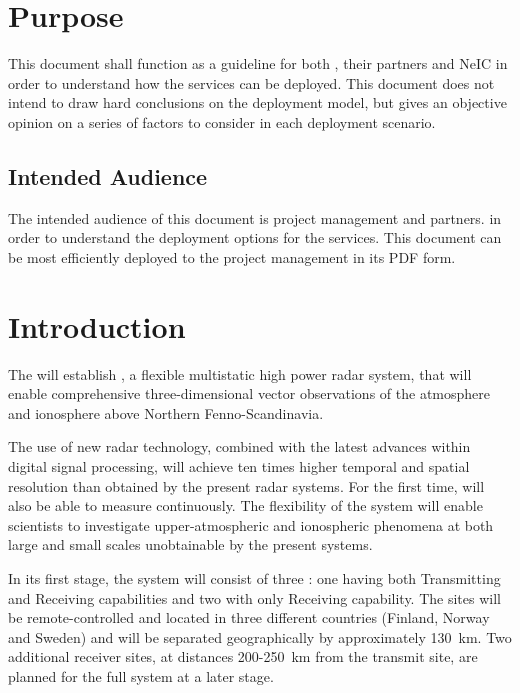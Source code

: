 \documentclass[12pt,a4paper]{article}
\begin{document}
\section{Purpose}
\label{purpose}

This document shall function as a guideline for both \EC, their partners and NeIC in order to understand how the \ED \einfra services can be deployed.
This document does not intend to draw hard conclusions on the deployment model, but gives an objective opinion on a series of factors to consider in each deployment scenario.

\subsection{Intended Audience}
\label{ssec:audiance}

The intended audience of this document is \ED project management and \EC partners.
in order to understand the deployment options for the \ED \einfra services.
This document can be
most efficiently deployed to the \ED project management in its PDF form.

\section{Introduction}
\label{intro}

The \ESA will establish \ED, a flexible multistatic high power radar system, that will enable comprehensive three-dimensional vector observations of the atmosphere and ionosphere above Northern Fenno-Scandinavia.  

The use of new radar technology, combined with the latest advances within digital signal processing,
will achieve ten times higher temporal and spatial resolution than
obtained by the present \EC radar systems. 
For the first time, \EC will also be able to measure continuously.  
The flexibility of the \ED system will enable scientists to investigate upper-atmospheric and 
ionospheric phenomena at both large and small scales unobtainable by the present systems.

In its first stage, the \ED system will consist of three \RSs:
one having both 
{T}ransmitting  and {R}eceiving 
capabilities and two with only Receiving capability.  
The sites will
be remote-controlled and located in three different countries (Finland,
Norway and Sweden) and will be separated geographically by
approximately 130~km.  
Two additional receiver sites, at distances 200-250~km from the transmit site, 
are planned for the full \ED system at a later stage.
\end{document}
